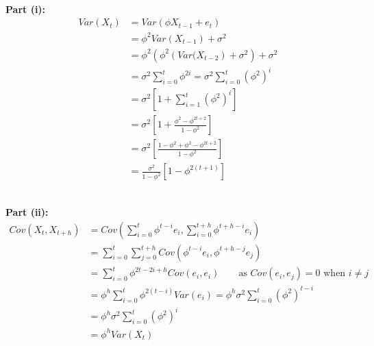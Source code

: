 \documentclass[10pt,a4paper]{exam}
\begin{document}
\begin{questions}
\begin{solution}
\\\textbf{Part (i):}\\
\begin{align*}
Var(X_t) 	&= Var(\phi X_{t-1} + e_t)\\
				&= \phi^2Var(X_{t-1}) + \sigma^2\\
				&= \phi^2\left(\phi^2\left(Var(X_{t-2}\right) + \sigma^2\right) + \sigma^2\\
				&= \sigma^2 \sum_{i=0}^t \phi^{2i} = \sigma^2 \sum_{i=0}^t \left(\phi^2\right)^i\\
				&= \sigma^2 \left[1 + \sum_{i=1}^t \left(\phi^2\right)^i \right]\\
				&= \sigma^2 \left[1 + \frac{\phi^2 - \phi^{2t+2}}{1 - \phi^2}\right]\\
				&= \sigma^2 \left[\frac{1 - \phi^2 + \phi^2 - \phi^{2t+2}}{1 - \phi^2}\right]\\
				&= \frac{\sigma^2}{1 - \phi^2}\left[1 - \phi^{2(t+1)}\right]
\end{align*}
\end{solution}
\pagebreak
\begin{solution}
\\\textbf{Part (ii):}\\
\begin{align*}
Cov(X_t, X_{t+h})		&= Cov\left(\sum_{i=0}^t \phi^{t-i}e_i, \sum_{i=0}^{t+h} \phi^{t+h-i}e_i\right)\\
								&= \sum_{i=0}^t \sum_{j=0}^{t+h} Cov(\phi^{t-i}e_i, \phi^{t+h-j}e_j)\\
								&= \sum_{i=0}^t \phi^{2t - 2i + h} Cov(e_i, e_i) \quad \quad \text{as }Cov(e_i, e_j) = 0\text{ when }i\neq j\\
								&= \phi^h \sum_{i=0}^t \phi^{2(t-i)} Var(e_i) = \phi^h \sigma^2 \sum_{i=0}^t \left(\phi^2\right)^{t-i}\\
								&= \phi^h \sigma^2 \sum_{i=0}^t \left(\phi^2\right)^i\\
								&= \phi^h Var(X_t)\\
\end{align*}


\end{solution}
\end{questions}
\end{document}
